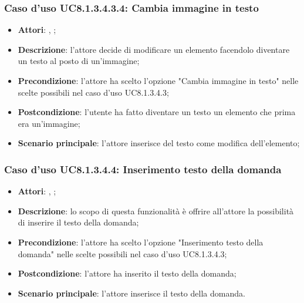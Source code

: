 		\subsubsection{Caso d'uso UC8.1.3.4.3.4: Cambia immagine in testo}
		\label{UC8.1.3.4.3.4}
		\begin{itemize}
			\item \textbf{Attori}: \uau, \uaupro;
			\item \textbf{Descrizione}: l'attore decide di modificare un elemento facendolo diventare un testo al posto di un'immagine;
			\item \textbf{Precondizione}: l'attore ha scelto l'opzione "Cambia immagine in testo" nelle scelte possibili nel caso d'uso UC8.1.3.4.3;
			\item \textbf{Postcondizione}: l'utente ha fatto diventare un testo un elemento che prima era un'immagine;
			\item \textbf{Scenario principale}: l'attore inserisce del testo come modifica dell'elemento;  
		\end{itemize}
		
	\subsubsection{Caso d'uso UC8.1.3.4.4: Inserimento testo della domanda}
	\begin{itemize}
		\item
		\textbf{Attori}: \uau, \uaupro;
		\item		
		\textbf{Descrizione}: lo scopo di questa funzionalità è offrire all'attore la possibilità di inserire il testo della domanda;
		\item
		\textbf{Precondizione}: l'attore ha scelto l'opzione "Inserimento testo della domanda" nelle scelte possibili nel caso d'uso UC8.1.3.4.3;
		\item \textbf{Postcondizione}: l'attore ha inserito il testo della domanda;
		\item \textbf{Scenario principale}: l'attore inserisce il testo della domanda. 
	\end{itemize}
